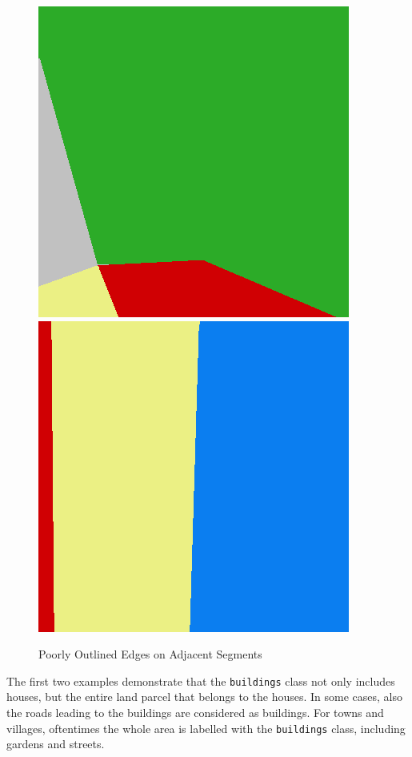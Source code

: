 \begin{figure}[h]
    \includegraphics[width=\LabelConsiderationImageWidth]{images/consideration_labels/69493-label}
    \hspace{1mm}
    \includegraphics[width=\LabelConsiderationImageWidth]{images/consideration_labels/71270-label}

    \caption{Poorly Outlined Edges on Adjacent Segments}
    \label{fig:label_considerations}
\end{figure}

The first two examples demonstrate that the \texttt{buildings} class not only includes houses, but the entire land parcel that belongs to the houses. In some cases, also the roads leading to the buildings are considered as buildings. For towns and villages, oftentimes the whole area is labelled with the \texttt{buildings} class, including gardens and streets.

